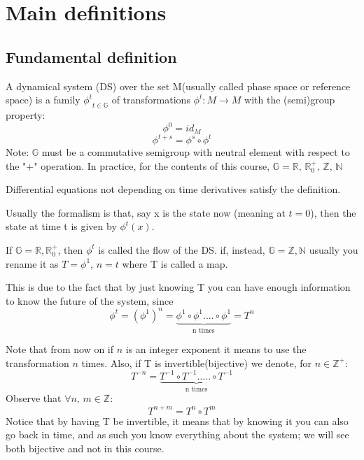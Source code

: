 \chapter*{Main definitions}
\section*{Fundamental definition}
\begin{definition}
    A dynamical system (DS) over the set M(usually called phase space or reference space) is a family ${\phi^t}_{t\in\mathbb{G}}$ of transformations $\phi^t:M\rightarrow M$ with the (semi)group property:
    \begin{equation*}
        \phi^0=id_M
    \end{equation*}
    \begin{equation*}
        \phi^{t+s}=\phi^s\circ \phi^t
    \end{equation*}
    Note: $\mathbb{G}$ must be a commutative semigroup with neutral element with respect to the "+" operation. In practice, for the contents of this course, $\mathbb{G}=\mathbb{R},\,\mathbb{R}^+_0,\,\mathbb{Z},\,\mathbb{N}$
\end{definition}

\begin{observation}
Differential equations not depending on time derivatives satisfy the definition.
\end{observation}

Usually the formalism is that, say x is the state now (meaning at $t=0$), then the state at time t is given by $\phi^t(x)$. 

\begin{definition}
    If $\mathbb{G}=\mathbb{R},\mathbb{R}^+_0$, then $\phi^t$ is called the flow of the DS. if, instead, $\mathbb{G}=\mathbb{Z},\mathbb{N}$ usually you rename it as $T=\phi^1,\,n=t$ where T is called a map.
\end{definition}
\begin{observation}
    This is due to the fact that by just knowing T you can have enough information to know the future of the system, since \begin{equation*}
    \phi^t=(\phi^1)^n=\underbrace{\phi^1\circ\phi^1....\circ\phi^1}_{\text{n times}}=T^n
    \end{equation*}
\end{observation}
Note that from now on if $n$ is an integer exponent it means to use the transformation $n$ times. Also, if T is invertible(bijective) we denote, for $n\in\mathbb{Z}^+$:\begin{equation*}
    T^{-n}=\underbrace{T^{-1}\circ T^{-1}.....\circ T^{-1}}_{\text{n times}}
\end{equation*}
Observe that $\forall n,\,m\in\mathbb{Z}$:
\begin{equation*}
    T^{n+m}=T^n\circ T^m
\end{equation*}
Notice that by having T be invertible, it means that by knowing it you can also go back in time, and as such you know everything about the system; we will see both bijective and not in this course. 